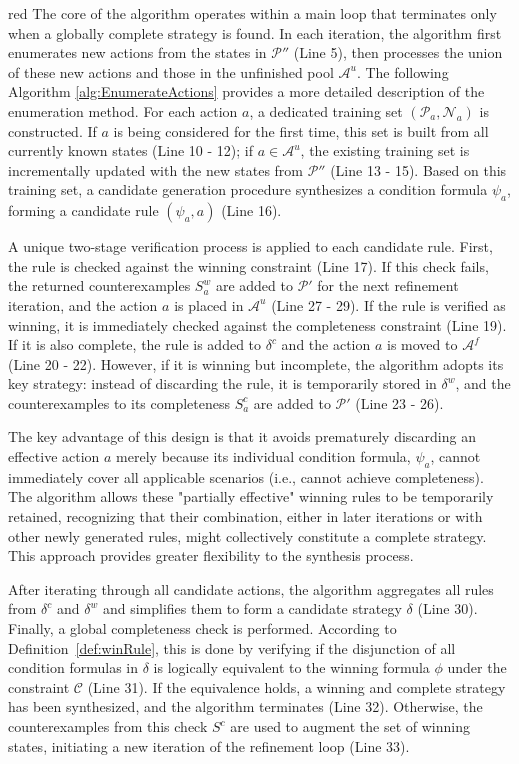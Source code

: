 \documentclass[review]{elsarticle}
\newcommand{\positiveSet}{\mathcal{P}}
\newcommand{\negativeSet}{\mathcal{N}}
\newcommand{\act}{\mathcal{A}}
\newcommand{\constraint}{\mathcal{C}}
\begin{document}
\begin{color}{red}
The core of the algorithm operates within a main loop that terminates only when a globally complete strategy is found. 
In each iteration, the algorithm first enumerates new actions from the states in $\positiveSet''$ (Line 5), 
then processes the union of these new actions and those in the unfinished pool $\act^u$. 
The following Algorithm \ref{alg:EnumerateActions} provides a more detailed description of the enumeration method. 
For each action $a$, a dedicated training set $(\positiveSet_a, \negativeSet_a)$ is constructed. 
If $a$ is being considered for the first time, this set is built from all currently known states (Line 10 - 12); 
if $a \in \act^u$, the existing training set is incrementally updated with the new states from $\positiveSet''$ (Line 13 - 15). 
Based on this training set, a candidate generation procedure synthesizes a condition formula $\psi_a$, forming a candidate rule $(\psi_a, a)$ (Line 16).

A unique two-stage verification process is applied to each candidate rule. 
First, the rule is checked against the winning constraint (Line 17). 
If this check fails, the returned counterexamples $S^w_a$ are added to $\positiveSet'$ for the next refinement iteration, and the action $a$ is placed in $\act^u$ (Line 27 - 29). 
If the rule is verified as winning, it is immediately checked against the completeness constraint (Line 19). 
If it is also complete, the rule is added to $\delta^c$ and the action $a$ is moved to $\act^f$ (Line 20 - 22). 
However, if it is winning but incomplete, the algorithm adopts its key strategy: 
instead of discarding the rule, it is temporarily stored in $\delta^w$, and the counterexamples to its completeness $S^c_a$ are added to $\positiveSet'$ (Line 23 - 26).

The key advantage of this design is that it avoids prematurely discarding an effective action $a$ merely because its individual condition formula, 
$\psi_a$, cannot immediately cover all applicable scenarios (i.e., cannot achieve completeness). 
The algorithm allows these "partially effective" winning rules to be temporarily retained, recognizing that their combination, either in later iterations or with other newly generated rules, might collectively constitute a complete strategy. 
This approach provides greater flexibility to the synthesis process.

After iterating through all candidate actions, the algorithm aggregates all rules from $\delta^c$ and $\delta^w$ and simplifies them to form a candidate strategy $\delta$ (Line 30). 
Finally, a global completeness check is performed. According to Definition~\ref{def:winRule}, this is done by verifying if the disjunction of all condition formulas in $\delta$ is logically equivalent to the winning formula $\phi$ under the constraint $\constraint$ (Line 31). 
If the equivalence holds, a winning and complete strategy has been synthesized, and the algorithm terminates (Line 32). 
Otherwise, the counterexamples from this check $S^c$ are used to augment the set of winning states, initiating a new iteration of the refinement loop (Line 33).
\end{color}
\end{document}
